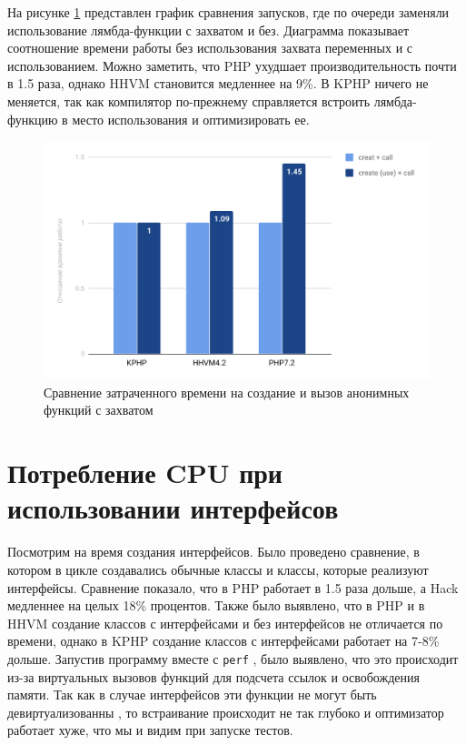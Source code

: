 На рисунке \ref{fig:benchmark-create_use_call-simple} представлен график сравнения запусков, где по очереди заменяли использование лямбда-функции с захватом и без.
Диаграмма показывает соотношение времени работы без использования захвата переменных и с использованием.
Можно заметить, что PHP ухудшает производительность почти в 1.5 раза, однако HHVM становится медленнее на 9\%.
В KPHP ничего не меняется, так как компилятор по-прежнему справляется встроить лямбда-функцию в место использования и оптимизировать ее.
\begin{figure}[H]
    \caption{Сравнение затраченного времени на создание и вызов анонимных функций с захватом}
    \label{fig:benchmark-create_use_call-simple}
    \centering
    \includegraphics[width=\linewidth]{images/benchmark_create_use_call_simple}
\end{figure}

\section{Потребление CPU при использовании интерфейсов}
Посмотрим на время создания интерфейсов.
Было проведено сравнение, в котором в цикле создавались обычные классы и классы, которые реализуют интерфейсы.
Сравнение показало, что в PHP работает в 1.5 раза дольше, а Hack медленнее на целых 18\% процентов.
Также было выявлено, что в PHP и в HHVM создание классов с интерфейсами и без интерфейсов не отличается по времени, однако в KPHP создание классов с интерфейсами работает на 7-8\% дольше.
Запустив программу вместе с \verb|perf| \cite{perf}, было выявлено, что это происходит из-за виртуальных вызовов функций для подсчета ссылок и освобождения памяти.
Так как в случае интерфейсов эти функции не могут быть девиртуализованны \cite{devirtualization}, то встраивание происходит не так глубоко и оптимизатор работает хуже, что мы и видим при запуске тестов.

